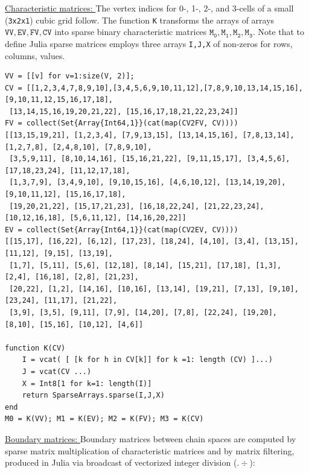 \documentclass{article}
\begin{document}
\vspace{10pt}
\noindent\underline{
Characteristic matrices:
}\vspace{0.2em}\newline 
The vertex indices for 0-, 1-, 2-, and 3-cells of a small (\texttt{3x2x1}) cubic grid follow.
The function \texttt{K} transforms the arrays of arrays $\mathtt{VV, EV, FV, CV}$ into sparse binary characteristic matrices
$\mathtt{M_0, M_1, M_2, M_3}$. Note that to define Julia sparse matrices employs three arrays \texttt{I,J,X} of non-zeros for rows, columns, values.

\begin{Verbatim}[fontsize=\footnotesize]
VV = [[v] for v=1:size(V, 2)];
CV = [[1,2,3,4,7,8,9,10],[3,4,5,6,9,10,11,12],[7,8,9,10,13,14,15,16],[9,10,11,12,15,16,17,18],  
 [13,14,15,16,19,20,21,22], [15,16,17,18,21,22,23,24]]
FV = collect(Set{Array{Int64,1}}(cat(map(CV2FV, CV))))
[[13,15,19,21], [1,2,3,4], [7,9,13,15], [13,14,15,16], [7,8,13,14], [1,2,7,8], [2,4,8,10], [7,8,9,10], 
 [3,5,9,11], [8,10,14,16], [15,16,21,22], [9,11,15,17], [3,4,5,6], [17,18,23,24], [11,12,17,18], 
 [1,3,7,9], [3,4,9,10], [9,10,15,16], [4,6,10,12], [13,14,19,20], [9,10,11,12], [15,16,17,18], 
 [19,20,21,22], [15,17,21,23], [16,18,22,24], [21,22,23,24], [10,12,16,18], [5,6,11,12], [14,16,20,22]]
EV = collect(Set{Array{Int64,1}}(cat(map(CV2EV, CV))))
[[15,17], [16,22], [6,12], [17,23], [18,24], [4,10], [3,4], [13,15], [11,12], [9,15], [13,19],
 [1,7], [5,11], [5,6], [12,18], [8,14], [15,21], [17,18], [1,3], [2,4], [16,18], [2,8], [21,23],
 [20,22], [1,2], [14,16], [10,16], [13,14], [19,21], [7,13], [9,10], [23,24], [11,17], [21,22],
 [3,9], [3,5], [9,11], [7,9], [14,20], [7,8], [22,24], [19,20], [8,10], [15,16], [10,12], [4,6]]

function K(CV)
    I = vcat( [ [k for h in CV[k]] for k =1: length (CV) ]...)
    J = vcat(CV ...)
    X = Int8[1 for k=1: length(I)]
    return SparseArrays.sparse(I,J,X)
end
M0 = K(VV); M1 = K(EV); M2 = K(FV); M3 = K(CV)
\end{Verbatim}

\noindent\underline{
Boundary matrices:
}\vspace{0.2em}\newline 
Boundary matrices between chain spaces are computed by sparse matrix multiplication of characteristic matrices
and by matrix filtering, produced in Julia via broadcast of vectorized integer division ($.\div$):
\end{document}
